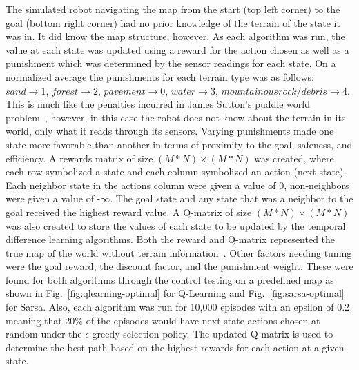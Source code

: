 \documentclass[12pt,american]{report}
\begin{document}
The simulated robot navigating the map from the start (top left corner) to the goal (bottom right corner) had no prior knowledge of the terrain of the state it was in.  It did know the map structure, however.  As each algorithm was run, the value at each state was updated using a reward for the action chosen as well as a punishment which was determined by the sensor readings for each state. On a normalized average the punishments for each terrain type was as follows: $sand \rightarrow 1$, $forest \rightarrow 2$, $pavement \rightarrow 0$, $water \rightarrow 3$, $mountainous rock/debris \rightarrow 4$. This is much like the penalties incurred in James Sutton's puddle world problem~\cite{sutton1996generalization}, however, in this case the robot does not know about the terrain in its world, only what it reads through its sensors. Varying punishments made one state more favorable than another in terms of proximity to the goal, safeness, and efficiency. A rewards matrix of size $(M*N) \times (M*N)$ was created, where each row symbolized a state and each column symbolized an action (next state).  Each neighbor state in the actions column were given a value of 0, non-neighbors were given a value of -\begin{math}\infty\end{math}. The goal state and any state that was a neighbor to the goal received the highest reward value.  A Q-matrix of size $(M*N) \times (M*N)$ was also created to store the values of each state to be updated by the temporal difference learning algorithms. Both the reward and Q-matrix represented the true map of the world without terrain information~\cite{tutorial}. Other factors needing tuning were the goal reward, the discount factor, and the punishment weight.  These were found for both algorithms through the control testing on a predefined map as shown in Fig.~\ref{fig:qlearning-optimal} for Q-Learning and Fig.~\ref{fig:sarsa-optimal} for Sarsa. Also, each algorithm was run for 10,000 episodes with an epsilon of 0.2 meaning that 20\% of the episodes would have next state actions chosen at random under the \begin{math}\epsilon\end{math}-greedy selection policy. The updated Q-matrix is used to determine the best path based on the highest rewards for each action at a given state.
\end{document}
